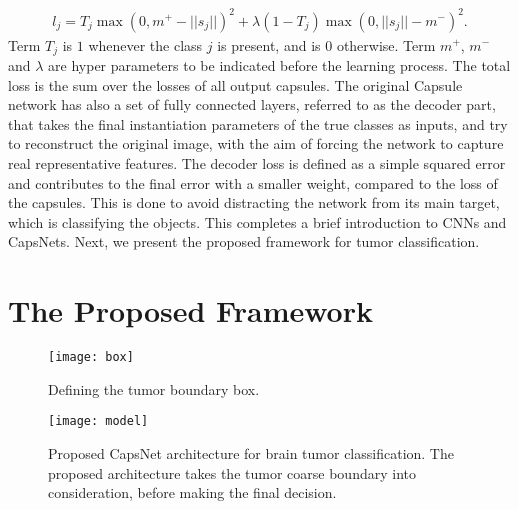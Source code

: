 \documentclass{article}
\begin{document}
\begin{eqnarray}
\label{eq:margin}
l_j=T_j \max(0,m^+\!\!\!-\!||s_j||)^2\!\!\!+\!\lambda(1\!-\!T_j) \max(0,||s_j||\!\!-\!m^-)^2.
\end{eqnarray}
Term $T_j$ is $1$ whenever the class $j$ is present, and is $0$ otherwise. Term $m^+$, $m^-$ and $\lambda$ are hyper parameters to be indicated before the learning process. The total loss is the sum over the losses of all output capsules. The original Capsule network has also a set of fully connected layers, referred to as the decoder part, that takes the final instantiation parameters of the true classes as inputs, and try to reconstruct the original image, with the aim of forcing the network to capture real representative features. The decoder loss is defined as a simple squared error and contributes to the final error with a smaller weight, compared to the loss of the capsules.  This is done to avoid distracting the network from its main target, which is classifying the objects. This completes a brief introduction to CNNs and CapsNets. Next, we present the proposed framework for  tumor classification.

\section{The Proposed Framework}\label{sec:WTE}
\begin{figure}[t!]
    \centering
    \texttt{[image: box]}
    \caption{\footnotesize Defining the tumor boundary box.}
    \label{fig:box}
\end{figure}
\begin{figure*}[t!]
\centering
\texttt{[image: model]}
\caption{\footnotesize Proposed CapsNet architecture for brain tumor classification. The proposed architecture takes the tumor coarse boundary into consideration, before making the final decision. \label{fig:model}}
\vspace{-.28in}
\end{figure*}
\end{document}
